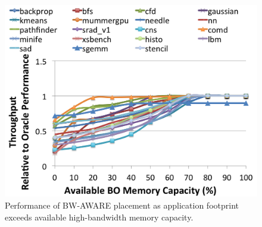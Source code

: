 \begin{figure}[t]
    \includegraphics[width=\columnwidth]{asplos2015/figures/bwaware-capacity.png}
    \caption{Performance of BW-AWARE placement as application footprint exceeds
available high-bandwidth
    memory capacity.}
    \label{fig:capacityconstrained}
\end{figure}

